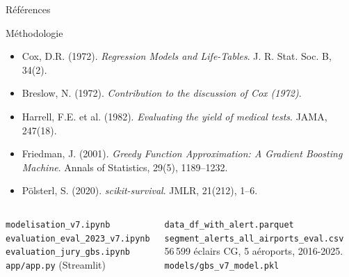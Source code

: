 \documentclass[aspectratio=169,t,11pt]{beamer}
\begin{document}
\begin{frame}{Références}
\vspace{-4pt}
\begin{block}{Méthodologie}
\scriptsize
\begin{itemize}\setlength\itemsep{0pt}
  \item Cox, D.R. (1972). \textit{Regression Models and Life-Tables}. J. R. Stat. Soc. B, 34(2).
  \item Breslow, N. (1972). \textit{Contribution to the discussion of Cox (1972)}.
  \item Harrell, F.E. et al. (1982). \textit{Evaluating the yield of medical tests}. JAMA, 247(18).
  \item Friedman, J. (2001). \textit{Greedy Function Approximation: A Gradient Boosting Machine}.
    Annals of Statistics, 29(5), 1189--1232.
  \item Pölsterl, S. (2020). \textit{scikit-survival}. JMLR, 21(212), 1--6.
\end{itemize}
\end{block}
\vspace{2pt}
\begin{columns}[T]
\begin{tcolorbox}[mybox,colback=metMid!10,colframe=metMid,title={Notebooks}]
\scriptsize
\texttt{modelisation\_v7.ipynb}\\
\texttt{evaluation\_eval\_2023\_v7.ipynb}\\
\texttt{evaluation\_jury\_gbs.ipynb}\\
\texttt{app/app.py} (Streamlit)
\end{tcolorbox}
\begin{tcolorbox}[mybox,colback=metOrange!10,colframe=metOrange,title={Données}]
\footnotesize
\texttt{data\_df\_with\_alert.parquet}\\
\texttt{segment\_alerts\_all\_airports\_eval.csv}\\
56\,599 éclairs CG, 5 aéroports, 2016-2025.\\
\texttt{models/gbs\_v7\_model.pkl}
\end{tcolorbox}
\end{columns}
\end{frame}
\end{document}
